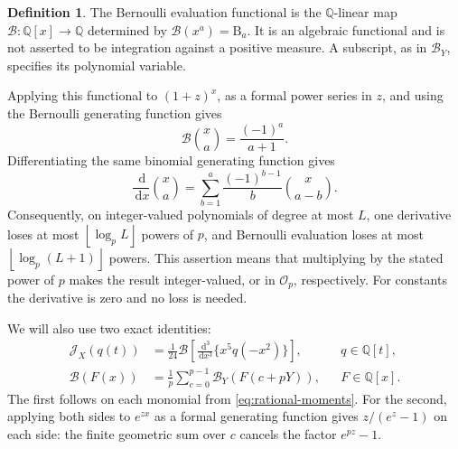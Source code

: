 \documentclass[11pt,letterpaper]{article}
\theoremstyle{definition}
\newtheorem{definition}[definition]{Definition}
\newcommand{\Q}{\mathbb Q}
\newcommand{\dd}{\,\mathrm d}
\newcommand{\J}{\mathcal J}
\newcommand{\Bfun}{\mathcal B}
\newcommand{\floor}[1]{\left\lfloor #1\right\rfloor}
\begin{document}
\begin{definition}\label{def:bernoulli-functional}
The Bernoulli evaluation functional is the $\Q$-linear map
$\Bfun:\Q[x]\to\Q$ determined by $\Bfun(x^a)=\mathrm B_a$.
It is an algebraic functional and is not asserted to be integration
against a positive measure. A subscript, as in $\Bfun_Y$, specifies its
polynomial variable.
\end{definition}

Applying this functional to $(1+z)^x$, as a formal power series in $z$,
and using the Bernoulli generating function gives
\begin{equation}\label{eq:bernoulli-newton}
 \Bfun\binom{x}{a}=\frac{(-1)^a}{a+1}.
\end{equation}
Differentiating the same binomial generating function gives
\begin{equation}\label{eq:newton-derivative}
 \frac{\dd}{\dd x}\binom{x}{a}
 =\sum_{b=1}^{a}\frac{(-1)^{b-1}}b\binom{x}{a-b}.
\end{equation}
Consequently, on integer-valued polynomials of degree at most $L$,
one derivative loses at most $\floor{\log_p L}$ powers of $p$, and
Bernoulli evaluation loses at most $\floor{\log_p(L+1)}$ powers.
This assertion means that multiplying by the stated power of $p$
makes the result integer-valued, or in $\mathcal O_p$, respectively.
For constants the derivative is zero and no loss is needed.

We will also use two exact identities:
\begin{align}
 \J_X(q(t))
 &=\frac1{24}\Bfun\left[
       \frac{\dd^3}{\dd x^3}\{x^5q(-x^2)\}\right],
       &&q\in\Q[t],\label{eq:bernoulli-moments}\\
 \Bfun(F(x))
 &=\frac1p\sum_{c=0}^{p-1}\Bfun_Y(F(c+pY)),
       &&F\in\Q[x].\label{eq:bernoulli-distribution}
\end{align}
The first follows on each monomial from \eqref{eq:rational-moments}.
For the second, applying both sides to $e^{zx}$ as a formal generating
function gives $z/(e^z-1)$ on each side: the finite geometric sum
over $c$ cancels the factor $e^{pz}-1$.
\end{document}
